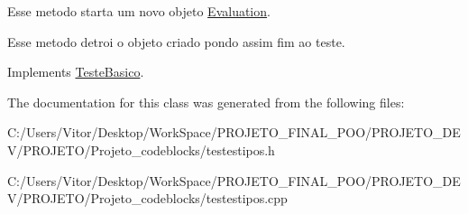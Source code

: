 Esse metodo starta um novo objeto \hyperlink{class_evaluation}{Evaluation}. 

Esse metodo detroi o objeto criado pondo assim fim ao teste. 

Implements \hyperlink{class_teste_basico_a9801730ac8a0acc39a901a179aa91e97}{Teste\-Basico}.



The documentation for this class was generated from the following files\-:\begin{DoxyCompactItemize}
\item 
C\-:/\-Users/\-Vitor/\-Desktop/\-Work\-Space/\-P\-R\-O\-J\-E\-T\-O\-\_\-\-F\-I\-N\-A\-L\-\_\-\-P\-O\-O/\-P\-R\-O\-J\-E\-T\-O\-\_\-\-D\-E\-V/\-P\-R\-O\-J\-E\-T\-O/\-Projeto\-\_\-codeblocks/testestipos.\-h\item 
C\-:/\-Users/\-Vitor/\-Desktop/\-Work\-Space/\-P\-R\-O\-J\-E\-T\-O\-\_\-\-F\-I\-N\-A\-L\-\_\-\-P\-O\-O/\-P\-R\-O\-J\-E\-T\-O\-\_\-\-D\-E\-V/\-P\-R\-O\-J\-E\-T\-O/\-Projeto\-\_\-codeblocks/testestipos.\-cpp\end{DoxyCompactItemize}
